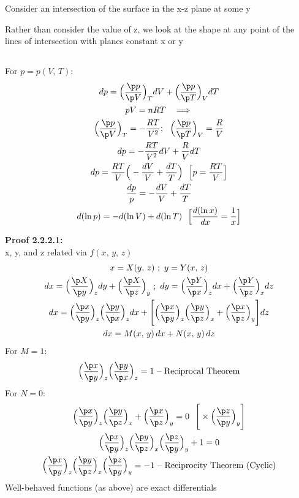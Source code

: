 \documentclass[a4paper, 11pt, normalem]{report}
\begin{document}
Consider an intersection of the surface in the x-z plane at some y

Rather than consider the value of z, we look at the shape at any point of the lines of intersection with planes constant x or y

\subsection{}
For $p = p(V,\,T)$:
\begin{gather*}
    dp = \Big(\frac{\p p}{\p V}\Big)_T dV + \Big(\frac{\p p}{\p T}\Big)_V dT \\
    pV = nRT ~~\implies \\
    \Big(\frac{\p p}{\p V}\Big)_T = -\frac{RT}{V^2};~~ \Big(\frac{\p p}{\p T}\Big)_V = \frac{R}{V} \\
    dp = -\frac{RT}{V^2}dV + \frac{R}{V}dT \\
    dp = \frac{RT}{V}\Big(- \frac{dV}{V} + \frac{dT}{T}\Big)~~ \Big[p = \frac{RT}{V}\Big] \\
    \frac{dp}{p} = - \frac{dV}{V} + \frac{dT}{T} \\
    d(\ln{p}) = -d(\ln{V}) + d(\ln{T})~~ \Big[\frac{d(\ln{x})}{dx} = \frac{1}{x} \Big]
\end{gather*}

\textbf{Proof 2.2.2.1:}\\
x, y, and z related via $f(x,\,y,\,z)$
\begin{gather*}
    x = X(y,\,z)~;~ y = Y(x,\,z) \\
    dx = \Big(\frac{\p X}{\p y} \Big)_z dy + \Big(\frac{\p X}{\p z} \Big)_y ~;~ dy = \Big(\frac{\p Y}{\p x} \Big)_z dx + \Big(\frac{\p Y}{\p z} \Big)_x dz \\
    dx = \Big(\frac{\p x}{\p y} \Big)_z \Big(\frac{\p y}{\p x} \Big)_z dx + \Bigg[\Big(\frac{\p x}{\p y} \Big)_z \Big(\frac{\p y}{\p z} \Big)_x + \Big(\frac{\p x}{\p z} \Big)_y \Bigg] dz \\
    dx = M(x,\,y)\,dx + N(x,\,y)\,dz
\end{gather*}
For $M = 1$:
\begin{equation*}
    \Big(\frac{\p x}{\p y} \Big)_z \Big(\frac{\p y}{\p x} \Big)_z = 1 \text{ -- Reciprocal Theorem}
\end{equation*}
For $N = 0$:
\begin{gather*}
    \Big(\frac{\p x}{\p y} \Big)_z \Big(\frac{\p y}{\p z} \Big)_x + \Big(\frac{\p x}{\p z} \Big)_y = 0 ~~ \Bigg[ \times \Big(\frac{\p z}{\p y} \Big)_y \Bigg] \\
    \Big(\frac{\p x}{\p y} \Big)_z \Big(\frac{\p y}{\p z} \Big)_x \Big(\frac{\p z}{\p y} \Big)_y + 1 = 0 \\
    \Big(\frac{\p x}{\p y} \Big)_z \Big(\frac{\p y}{\p z} \Big)_x \Big(\frac{\p z}{\p y} \Big)_y = -1 \text{ -- Reciprocity Theorem (Cyclic)}
\end{gather*}
Well-behaved functions (as above) are exact differentials
\end{document}
